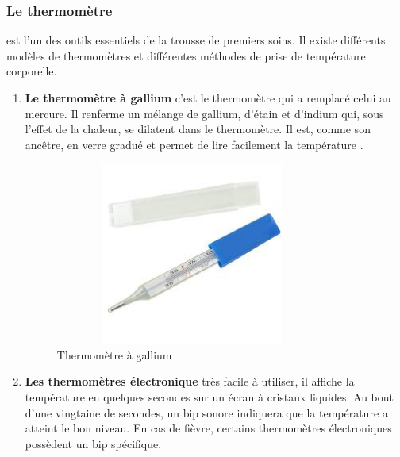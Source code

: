 \documentclass[12pt]{article}
\begin{document}
\subsubsection{Le thermomètre}
est l’un des outils essentiels de la trousse de premiers soins. Il existe différents modèles de thermomètres et différentes méthodes de prise de température corporelle.
\begin{enumerate}
	\item \textbf{Le thermomètre à gallium} c’est le thermomètre qui a remplacé celui au mercure. Il renferme un mélange de gallium, d’étain et d’indium qui, sous l’effet de la chaleur, se dilatent dans le thermomètre. Il est, comme son ancêtre, en verre gradué et permet de lire facilement la température \cite{36}.
	\begin{figure}[h]
		\centering
		\includegraphics[height=6cm,width=9cm]{img-Chapiter-2/galune.jpeg}
		\caption{Thermomètre à gallium}
		\label{fig:gallium}
	\end{figure}
	\newpage
	\item \textbf{Les thermomètres électronique} très facile à utiliser, il affiche la température en quelques secondes sur un écran à cristaux liquides. Au bout d’une vingtaine de secondes, un bip sonore indiquera que la température a atteint le bon niveau. En cas de fièvre, certains thermomètres électroniques possèdent un bip spécifique. 
	

\end{enumerate}
\end{document}
